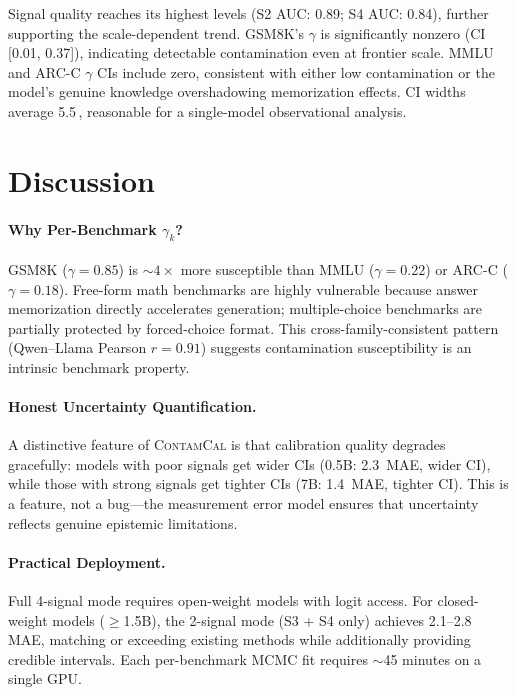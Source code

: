 \documentclass[11pt,a4paper]{article}
\newcommand{\contamcal}{\textsc{ContamCal}}
\newcommand{\pp}{\,\text{pp}}
\begin{document}
Signal quality reaches its highest levels (S2 AUC: 0.89; S4 AUC: 0.84), further supporting the scale-dependent trend.
GSM8K's $\gamma$ is significantly nonzero (CI [0.01, 0.37]), indicating detectable contamination even at frontier scale.
MMLU and ARC-C $\gamma$ CIs include zero, consistent with either low contamination or the model's genuine knowledge overshadowing memorization effects.
CI widths average 5.5\pp{}, reasonable for a single-model observational analysis.

\section{Discussion}
\label{sec:discussion}

\paragraph{Why Per-Benchmark $\gamma_k$?}
GSM8K ($\gamma = 0.85$) is ${\sim}4\times$ more susceptible than MMLU ($\gamma = 0.22$) or ARC-C ($\gamma = 0.18$).
Free-form math benchmarks are highly vulnerable because answer memorization directly accelerates generation; multiple-choice benchmarks are partially protected by forced-choice format.
This cross-family-consistent pattern (Qwen--Llama Pearson $r = 0.91$) suggests contamination susceptibility is an intrinsic benchmark property.

\paragraph{Honest Uncertainty Quantification.}
A distinctive feature of \contamcal{} is that calibration quality degrades gracefully: models with poor signals get wider CIs (0.5B: 2.3\pp{} MAE, wider CI), while those with strong signals get tighter CIs (7B: 1.4\pp{} MAE, tighter CI).
This is a feature, not a bug---the measurement error model ensures that uncertainty reflects genuine epistemic limitations.

\paragraph{Practical Deployment.}
Full 4-signal mode requires open-weight models with logit access.
For closed-weight models ($\geq$1.5B), the 2-signal mode (S3 + S4 only) achieves 2.1--2.8\pp{} MAE, matching or exceeding existing methods while additionally providing credible intervals.
Each per-benchmark MCMC fit requires $\sim$45 minutes on a single GPU.
\end{document}
